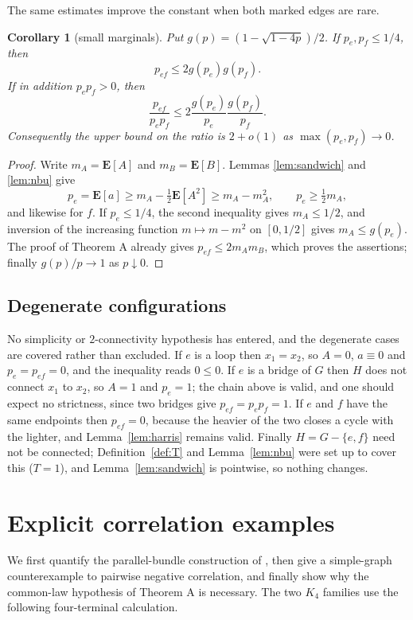 \documentclass[11pt,a4paper]{amsart}
\theoremstyle{plain}
\newtheorem{corollary}[theorem]{Corollary}
\theoremstyle{definition}
\theoremstyle{remark}
\newcommand{\E}{\mathbf{E}}
\begin{document}
The same estimates improve the constant when both marked edges are rare.

\begin{corollary}[small marginals]
\label{cor:small-marginals}
Put $g(p)=(1-\sqrt{1-4p})/2$. If $p_e,p_f\le1/4$, then
\[
p_{ef}\le 2g(p_e)g(p_f).
\]
If in addition $p_ep_f>0$, then
\[
\frac{p_{ef}}{p_ep_f}\le
2\frac{g(p_e)}{p_e}\frac{g(p_f)}{p_f}.
\]
Consequently the upper bound on the ratio is $2+o(1)$ as
$\max(p_e,p_f)\to0$.
\end{corollary}

\begin{proof}
Write $m_A=\E[A]$ and $m_B=\E[B]$. Lemmas \ref{lem:sandwich} and
\ref{lem:nbu} give
\[
p_e=\E[a]\ge m_A-\tfrac12\E[A^2]\ge m_A-m_A^2,
\qquad p_e\ge\tfrac12m_A,
\]
and likewise for $f$. If $p_e\le1/4$, the second inequality gives
$m_A\le1/2$, and inversion of the increasing function $m\mapsto m-m^2$ on
$[0,1/2]$ gives $m_A\le g(p_e)$. The proof of Theorem A already gives
$p_{ef}\le2m_Am_B$, which proves the assertions; finally $g(p)/p\to1$ as
$p\downarrow0$.
\end{proof}

\subsection{Degenerate configurations}
\label{sec:degenerate}

No simplicity or $2$-connectivity hypothesis has entered, and the degenerate
cases are covered rather than excluded. If $e$ is a loop then $x_1=x_2$, so
$A=0$, $a\equiv0$ and $p_e=p_{ef}=0$, and the inequality reads $0\le0$. If $e$
is a bridge of $G$ then $H$ does not connect $x_1$ to $x_2$, so $A=1$ and
$p_e=1$; the chain above is valid, and one should expect no strictness, since
two bridges give $p_{ef}=p_ep_f=1$. If $e$ and $f$ have the same endpoints then
$p_{ef}=0$, because the heavier of the two closes a cycle with the lighter, and
Lemma~\ref{lem:harris} remains valid. Finally $H=G-\{e,f\}$ need not be
connected; Definition~\ref{def:T} and Lemma~\ref{lem:nbu} were set up to cover
this ($T=1$), and Lemma~\ref{lem:sandwich} is pointwise, so nothing changes.

\section{Explicit correlation examples}
\label{sec:k4}

We first quantify the parallel-bundle construction of \cite{LPS}, then give a
simple-graph counterexample to pairwise negative correlation, and finally show
why the common-law hypothesis of Theorem A is necessary. The two $K_4$
families use the following four-terminal calculation.
\end{document}
